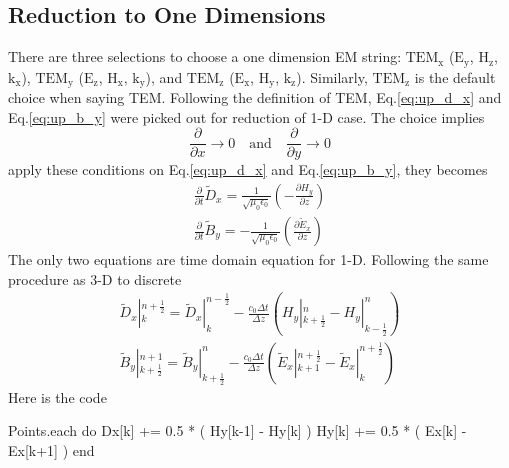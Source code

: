 \subsection{Reduction to One Dimensions}
There are three selections to choose a one dimension EM string: $\mathrm{TEM_x}$ ($\mathrm{E_{y}}$, $\mathrm{H_{z}}$,
$\mathrm{k_x}$), $\mathrm{TEM_y}$ ($\mathrm{E_z}$, $\mathrm{H_x}$, $\mathrm{k_y}$), and $\mathrm{TEM_z}$
($\mathrm{E_x}$, $\mathrm{H_y}$, $\mathrm{k_z}$). Similarly, $\mathrm{TEM_z}$ is the default choice when saying
TEM. Following the definition of TEM, Eq.\ref{eq:up_d_x} and Eq.\ref{eq:up_b_y} were picked out for reduction of 1-D
case. The choice implies
\begin{displaymath}
  \frac{\partial}{\partial x} \rightarrow 0\quad \mathrm{and} \quad
  \frac{\partial}{\partial y} \rightarrow 0
\end{displaymath}
apply these conditions on Eq.\ref{eq:up_d_x} and Eq.\ref{eq:up_b_y}, they becomes
\begin{gather}
  \frac{\partial}{\partial t}\widetilde{D}_x = \frac{1}{\sqrt{\mu_0\epsilon_0}}\left( - \frac{\partial H_y}{\partial z}\right)\\
  \frac{\partial}{\partial t}\widetilde{B}_y =-\frac{1}{\sqrt{\mu_0\epsilon_0}}\left(\frac{\partial \widetilde{E}_x}{\partial z} \right)
\end{gather}
The only two equations are time domain equation for 1-D. Following the same procedure as 3-D to discrete
\begin{gather}
  \widetilde{D}_x|_k^{n+\frac{1}{2}} = \widetilde{D}_x|_k^{n-\frac{1}{2}} - \frac{c_0\Delta t}{\Delta z}\left( H_y|_{k+\frac{1}{2}}^n - H_y|_{k-\frac{1}{2}}^n \right)\\
  \widetilde{B}_y|_{k+\frac{1}{2}}^{n+1} = \widetilde{B}_y|_{k+\frac{1}{2}}^{n} - \frac{c_0\Delta t}{\Delta z}\left( \widetilde{E}_x|_{k+1}^{n+\frac{1}{2}} - \widetilde{E}_x|_{k}^{n+\frac{1}{2}} \right)
\end{gather}
Here is the code
\begin{code}
Points.each do
  Dx[k] += 0.5 * ( Hy[k-1] - Hy[k] )
  Hy[k] += 0.5 * ( Ex[k] - Ex[k+1] )
end
\end{code}




